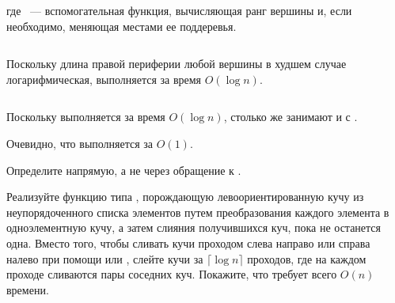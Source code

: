 \begin{frame}[fragile]{}
\inputminted[firstline=23, lastline=26] {haskell}{code/Heap.hs}

где ~--- вспомогательная функция, вычисляющая ранг
вершины  и, если необходимо, меняющая местами ее
поддеревья.

\inputminted[firstline=30, lastline=35] {haskell}{code/Heap.hs}

Поскольку длина правой периферии любой вершины в худшем случае
логарифмическая,  выполняется за время $O(\log n)$.
\end{frame}

\begin{frame}[fragile]{}
\inputminted[firstline=36, lastline=38] {haskell}{code/Heap.hs}

Поскольку  выполняется за время $O(\log n)$, столько
же занимают и  с .

 Очевидно,
что  выполняется за $O(1)$. 
\end{frame}

\ifanswers
\begin{frame}[fragile]{}
\begin{exercise}\label{ex:3.2}
  Определите  напрямую, а не через обращение к .
\end{exercise}

\begin{exercise}\label{ex:3.3}
  Реализуйте функцию  типа ,
  порождающую левоориентированную кучу из неупорядоченного списка
  элементов путем преобразования каждого элемента в одноэлементную
  кучу, а затем слияния получившихся куч, пока не останется
  одна. Вместо того, чтобы сливать кучи проходом слева направо или
  справа налево при помощи  или ,
  слейте кучи за $\lceil \log n \rceil$ проходов, где на каждом
  проходе сливаются пары соседних куч. Покажите, что
   требует всего $O(n)$ времени.
\end{exercise}
\end{frame}
\fi 


